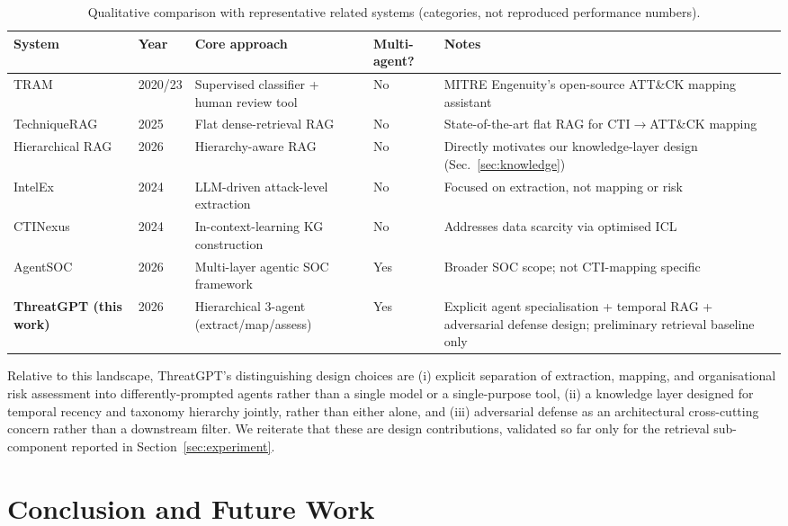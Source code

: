 \documentclass[runningheads]{llncs}
\begin{document}
\begin{table}[t]
\centering
\caption{Qualitative comparison with representative related systems (categories, not reproduced performance numbers).}
\label{tab:related}
\small
\begin{tabular}{@{}p{2.6cm}p{1.6cm}p{2.6cm}p{2.2cm}p{3.2cm}@{}}
\toprule
\textbf{System} & \textbf{Year} & \textbf{Core approach} & \textbf{Multi-agent?} & \textbf{Notes} \\
\midrule
TRAM \cite{tramtool} & 2020/23 & Supervised classifier + human review tool & No & MITRE Engenuity's open-source ATT\&CK mapping assistant \\
TechniqueRAG \cite{hierrag2026} & 2025 & Flat dense-retrieval RAG & No & State-of-the-art flat RAG for CTI$\rightarrow$ATT\&CK mapping \\
Hierarchical RAG \cite{hierrag2026} & 2026 & Hierarchy-aware RAG & No & Directly motivates our knowledge-layer design (Sec.~\ref{sec:knowledge}) \\
IntelEx \cite{intelex2024} & 2024 & LLM-driven attack-level extraction & No & Focused on extraction, not mapping or risk \\
CTINexus \cite{ctinexus2024} & 2024 & In-context-learning KG construction & No & Addresses data scarcity via optimised ICL \\
AgentSOC \cite{agentsoc2026} & 2026 & Multi-layer agentic SOC framework & Yes & Broader SOC scope; not CTI-mapping specific \\
\textbf{ThreatGPT (this work)} & 2026 & Hierarchical 3-agent (extract/map/assess) & Yes & Explicit agent specialisation + temporal RAG + adversarial defense design; preliminary retrieval baseline only \\
\bottomrule
\end{tabular}
\end{table}

Relative to this landscape, ThreatGPT's distinguishing design choices are (i) explicit separation of extraction, mapping, and organisational risk assessment into differently-prompted agents rather than a single model or a single-purpose tool, (ii) a knowledge layer designed for temporal recency and taxonomy hierarchy jointly, rather than either alone, and (iii) adversarial defense as an architectural cross-cutting concern rather than a downstream filter. We reiterate that these are design contributions, validated so far only for the retrieval sub-component reported in Section~\ref{sec:experiment}.

\section{Conclusion and Future Work}
\label{sec:conclusion}
\end{document}
